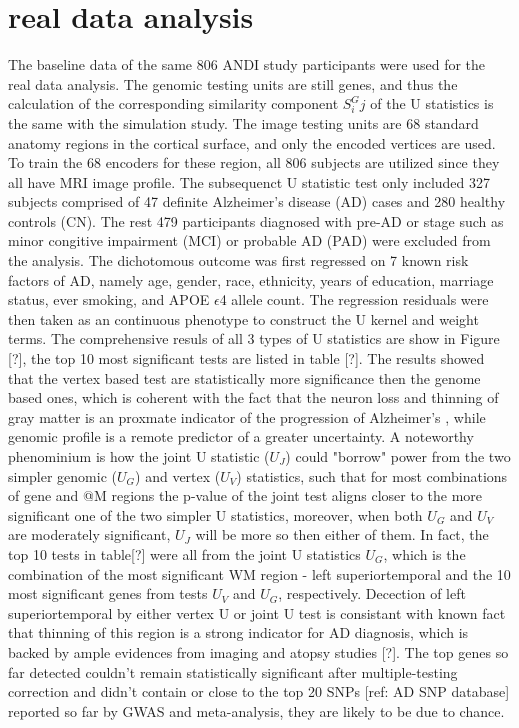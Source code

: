 \documentclass[twocolumn]{article}
\begin{document}
\section{real data analysis}
The baseline data of the same 806 ANDI study participants were used for the real data analysis. The genomic testing units are still genes, and thus the calculation of the corresponding similarity component $S^G_ij$ of the U statistics is the same with the simulation study. The image testing units are 68 standard anatomy regions in the cortical surface, and only the encoded vertices are used. To train the 68 encoders for these region, all 806 subjects are utilized since they all have MRI image profile. The subsequenct U statistic test only included 327 subjects comprised of 47 definite Alzheimer's disease (AD) cases and 280 healthy controls (CN). The rest 479 participants diagnosed with pre-AD or stage such as minor congitive impairment (MCI) or probable AD (PAD) were excluded from the analysis. The dichotomous outcome was first regressed on 7 known risk factors of AD, namely age, gender, race, ethnicity, years of education, marriage status, ever smoking, and APOE $\epsilon$4 allele count. The regression residuals were then taken as an continuous phenotype to construct the U kernel and weight terms. The comprehensive resuls of all 3 types of U statistics are show in Figure [?], the top 10 most significant tests are listed in table [?]. 
The results showed that the vertex based test are statistically more significance then the genome based ones, which is coherent with the fact that the neuron loss and thinning of gray matter is an proxmate indicator of the progression of Alzheimer's , while genomic profile is a remote predictor of a greater uncertainty. A noteworthy phenominium is how the joint U statistic ($U_J$) could "borrow" power from the two simpler genomic ($U_G$) and vertex ($U_V$) statistics, such that for most combinations of gene and @M regions the p-value of the joint test aligns closer to the more significant one of the two simpler U statistics, moreover, when both $U_G$ and $U_V$ are moderately significant, $U_J$ will be more so then either of them. In fact, the top 10 tests in table[?] were all from the joint U statistics $U_G$, which is the combination of the most significant WM region - left superiortemporal and the 10 most significant genes from tests $U_V$ and $U_G$, respectively. Decection of left superiortemporal by either vertex U or joint U test is consistant with known fact that thinning of this region is a strong indicator for AD diagnosis, which is backed by ample evidences from imaging and atopsy studies [?]. The top genes so far detected couldn't remain statistically significant after multiple-testing correction and didn't contain or close to the top 20 SNPs [ref: AD SNP database] reported so far by GWAS and meta-analysis, they are likely to be due to chance. 
\end{document}
